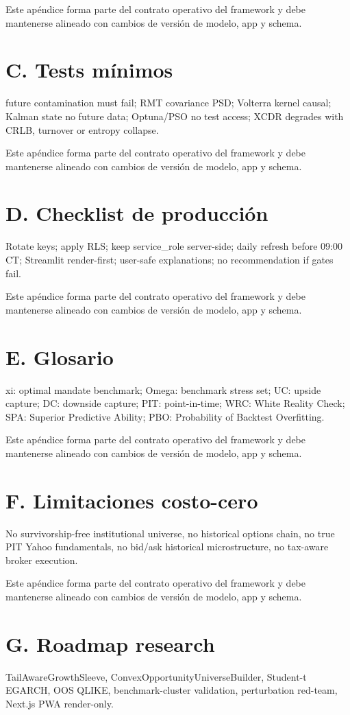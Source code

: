 \documentclass[11pt,letterpaper]{article}
\begin{document}
Este apéndice forma parte del contrato operativo del framework y debe mantenerse alineado con cambios de versión de modelo, app y schema.

\section{C. Tests mínimos}
future contamination must fail; RMT covariance PSD; Volterra kernel causal; Kalman state no future data; Optuna/PSO no test access; XCDR degrades with CRLB, turnover or entropy collapse.

Este apéndice forma parte del contrato operativo del framework y debe mantenerse alineado con cambios de versión de modelo, app y schema.

\section{D. Checklist de producción}
Rotate keys; apply RLS; keep service\_role server-side; daily refresh before 09:00 CT; Streamlit render-first; user-safe explanations; no recommendation if gates fail.

Este apéndice forma parte del contrato operativo del framework y debe mantenerse alineado con cambios de versión de modelo, app y schema.

\section{E. Glosario}
xi: optimal mandate benchmark; Omega: benchmark stress set; UC: upside capture; DC: downside capture; PIT: point-in-time; WRC: White Reality Check; SPA: Superior Predictive Ability; PBO: Probability of Backtest Overfitting.

Este apéndice forma parte del contrato operativo del framework y debe mantenerse alineado con cambios de versión de modelo, app y schema.

\section{F. Limitaciones costo-cero}
No survivorship-free institutional universe, no historical options chain, no true PIT Yahoo fundamentals, no bid/ask historical microstructure, no tax-aware broker execution.

Este apéndice forma parte del contrato operativo del framework y debe mantenerse alineado con cambios de versión de modelo, app y schema.

\section{G. Roadmap research}
TailAwareGrowthSleeve, ConvexOpportunityUniverseBuilder, Student-t EGARCH, OOS QLIKE, benchmark-cluster validation, perturbation red-team, Next.js PWA render-only.
\end{document}
